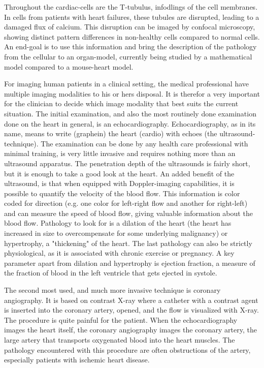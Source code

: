 \documentclass[12p]{article}
\begin{document}
Throughout the cardiac-cells are the T-tubulus, infodlings of the cell membranes.
In cells from patients with heart failures, these tubules are disrupted, leading to a damaged flux of calcium.
This disruption can be imaged by confocal microscopy, showing distinct pattern differences in non-healthy cells compared to normal cells.
An end-goal is to use this information and bring the description of the pathology from the cellular to an organ-model, currently being studied by a mathematical model compared to a mouse-heart model.

For imaging human patients in a clinical setting, the medical professional have multiple imaging modalities to his or hers disposal.
It is therefor a very important for the clinician to decide which image modality that best suits the current situation.
The initial examination, and also the most routinely done examination done on the heart in general, is an echocardiography.
Echocardiography, as in its name, means to write (graphein) the heart (cardio) with echoes (the ultrasound-technique).
The examination can be done by any health care professional with minimal training, is very little invasive and requires nothing more than an ultrasound apparatus.
The penetration depth of the ultrasounds is fairly short, but it is enough to take a good look at the heart.
An added benefit of the ultrasound, is that when equipped with Doppler-imaging capabilities, it is possible to quantify the velocity of the blood flow.
This information is color coded for direction (e.g. one color for left-right flow and another for right-left) and can measure the speed of blood flow, giving valuable information about the blood flow.
Pathology to look for is a dilation of the heart (the heart has increased in size to overcompensate for some underlying malignancy) or hypertrophy, a "thickening" of the heart.
The last pathology can also be strictly physiological, as it is associated with chronic exercise or pregnancy.
A key parameter apart from dilation and hypertrophy is ejection fraction, a measure of the fraction of blood in the left ventricle that gets ejected in systole.

The second most used, and much more invasive technique is coronary angiography.
It is based on contrast X-ray where a catheter with a contrast agent is inserted into the coronary artery, opened, and the flow is visualized with X-ray.
The procedure is quite painful for the patient.
When the echocardiography images the heart itself, the coronary angiography images the coronary artery, the large artery that transports oxygenated blood into the heart muscles.
The pathology encountered with this procedure are often obstructions of the artery, especially patients with ischemic heart disease. 
\end{document}
